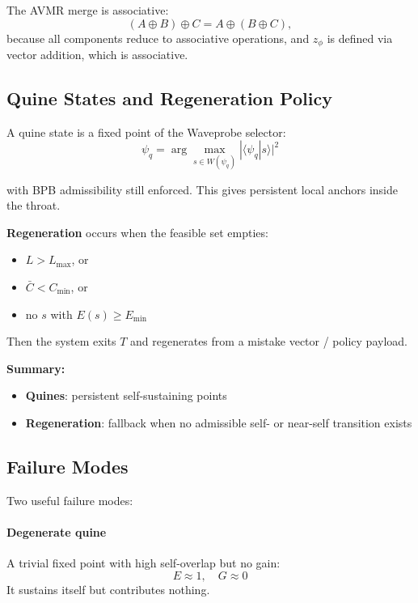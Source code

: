 \documentclass[11pt,a4paper]{article}
\begin{document}
\begin{proposition}[Associativity]
The AVMR merge is associative:
\begin{equation}
(A \oplus B) \oplus C = A \oplus (B \oplus C),
\label{eq:avmr_assoc}
\end{equation}
because all components reduce to associative operations, and $z_\phi$ is defined via vector addition, which is associative.
\end{proposition}

\subsection{Quine States and Regeneration Policy}

A quine state is a fixed point of the Waveprobe selector:
\begin{equation}
\psi_q = \arg\max_{s \in W(\psi_q)} |\langle \psi_q | s \rangle|^2
\label{eq:quine_state}
\end{equation}

with BPB admissibility still enforced. This gives persistent local anchors inside the throat.

\textbf{Regeneration} occurs when the feasible set empties:
\begin{itemize}
    \item $L > L_{\max}$, or
    \item $\bar{C} < C_{\min}$, or
    \item no $s$ with $E(s) \geq E_{\min}$
\end{itemize}

Then the system exits $T$ and regenerates from a mistake vector / policy payload.

\textbf{Summary:}
\begin{itemize}
    \item \textbf{Quines}: persistent self-sustaining points
    \item \textbf{Regeneration}: fallback when no admissible self- or near-self transition exists
\end{itemize}

\subsection{Failure Modes}

Two useful failure modes:

\paragraph{Degenerate quine}
A trivial fixed point with high self-overlap but no gain:
\begin{equation}
E \approx 1, \quad G \approx 0
\label{eq:degenerate_quine}
\end{equation}
It sustains itself but contributes nothing.
\end{document}
